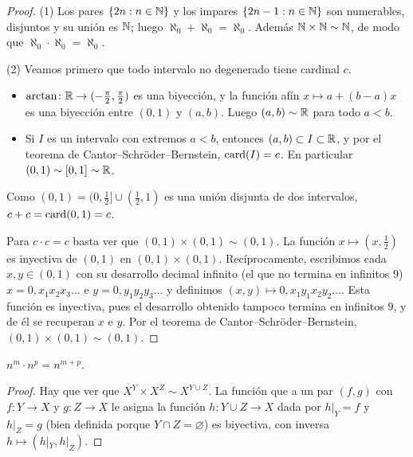 \begin{proof}
  (1) Los pares \(\{2n : n \in \mathbb{N}\}\) y los impares \(\{2n - 1 : n \in \mathbb{N}\}\) son numerables, disjuntos y su unión es \(\mathbb{N}\); luego \(\aleph_0 + \aleph_0 = \aleph_0\). Además \(\mathbb{N} \times \mathbb{N} \sim \mathbb{N}\), de modo que \(\aleph_0 \cdot \aleph_0 = \aleph_0\).

  (2) Veamos primero que todo intervalo no degenerado tiene cardinal \(c\).
  \begin{itemize}
    \item \(\arctan\colon \mathbb{R} \to (-\frac{\pi}{2}, \frac{\pi}{2})\) es una biyección, y la función afín \(x \mapsto a + (b - a)x\) es una biyección entre \((0, 1)\) y \((a, b)\). Luego \((a, b) \sim \mathbb{R}\) para todo \(a < b\).
    \item Si \(I\) es un intervalo con extremos \(a < b\), entonces \((a, b) \subset I \subset \mathbb{R}\), y por el teorema de Cantor--Schröder--Bernstein, \(\operatorname{card}(I) = c\). En particular \((0, 1) \sim [0, 1] \sim \mathbb{R}\).
  \end{itemize}
  Como \((0, 1) = (0, \tfrac{1}{2}] \cup (\tfrac{1}{2}, 1)\) es una unión disjunta de dos intervalos, \(c + c = \operatorname{card}(0, 1) = c\).

  Para \(c \cdot c = c\) basta ver que \((0, 1) \times (0, 1) \sim (0, 1)\). La función \(x \mapsto (x, \tfrac{1}{2})\) es inyectiva de \((0, 1)\) en \((0, 1) \times (0, 1)\). Recíprocamente, escribimos cada \(x, y \in (0, 1)\) con su desarrollo decimal infinito (el que no termina en infinitos \(9\)) \(x = 0, x_1 x_2 x_3 \dots\) e \(y = 0, y_1 y_2 y_3 \dots\) y definimos \((x, y) \mapsto 0, x_1 y_1 x_2 y_2 \dots\). Esta función es inyectiva, pues el desarrollo obtenido tampoco termina en infinitos \(9\), y de él se recuperan \(x\) e \(y\). Por el teorema de Cantor--Schröder--Bernstein, \((0, 1) \times (0, 1) \sim (0, 1)\).
\end{proof}

\begin{prop}
  \(n^m \cdot n^p = n^{m + p}\).
\end{prop}

\begin{proof}
  Hay que ver que \(X^Y \times X^Z \sim X^{Y \cup Z}\). La función que a un par \((f, g)\) con \(f\colon Y \to X\) y \(g\colon Z \to X\) le asigna la función \(h\colon Y \cup Z \to X\) dada por \(h|_Y = f\) y \(h|_Z = g\) (bien definida porque \(Y \cap Z = \varnothing\)) es biyectiva, con inversa \(h \mapsto (h|_Y, h|_Z)\).
\end{proof}

